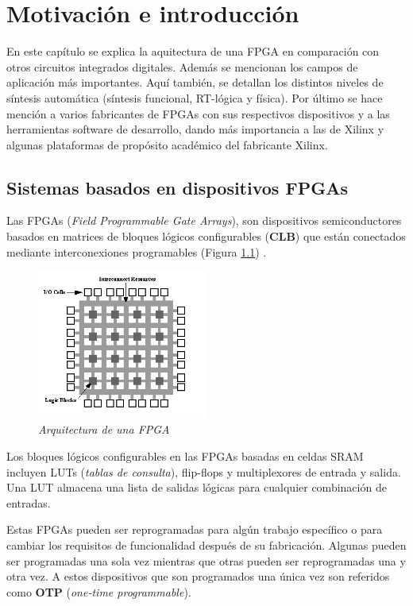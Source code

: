 \chapter{Motivación e introducción}

En este capítulo se explica la aquitectura de una FPGA en comparación con otros circuitos integrados digitales. Además se mencionan los campos de aplicación más 
importantes. Aquí también, se detallan los distintos niveles de síntesis automática (síntesis funcional, RT-lógica y física). 
Por último se hace mención a varios fabricantes de FPGAs con sus respectivos dispositivos y a las herramientas software de desarrollo, 
dando más importancia a las de Xilinx y algunas plataformas de propósito académico del fabricante Xilinx.

\section{Sistemas basados en dispositivos FPGAs} 

Las FPGAs (\textit{Field Programmable Gate Arrays}), son dispositivos semiconductores basados en matrices de bloques lógicos configurables
(\textbf{CLB}) que están conectados mediante interconexiones programables (Figura \ref{arqFPGA}) \cite{fpga_xilinx}. 

\begin{figure}[H]
    \centering
    \includegraphics[width = 0.5\textwidth]{imagenes/arqFPGA.png}
    \caption{\textit{Arquitectura de una FPGA \cite{arquitectura}}}\label{arqFPGA}
\end{figure}

Los bloques lógicos configurables en las FPGAs basadas en celdas SRAM incluyen LUTs (\textit{tablas de consulta}), flip-flops y 
multiplexores de entrada y salida. Una LUT almacena una lista de salidas lógicas para cualquier combinación de 
entradas.

Estas FPGAs pueden ser reprogramadas para  algún trabajo específico o para cambiar los requisitos de funcionalidad después de su 
fabricación. Algunas pueden ser programadas una sola vez mientras que otras pueden ser reprogramadas una y otra vez. A estos 
dispositivos que son programados una única vez son referidos como \textbf{OTP} (\textit{one-time programmable}).

